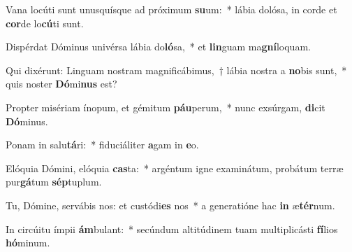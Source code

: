 \item Vana locúti sunt unusquísque ad próximum \textbf{su}um:~* lábia dolósa, in corde et \textbf{cor}de lo\textbf{cú}ti sunt.
\item Dispérdat Dóminus univérsa lábia do\textbf{ló}sa,~* et \textbf{lin}guam ma\textbf{gní}loquam.
\item Qui dixérunt: Linguam nostram magnificábimus,~† lábia nostra a \textbf{no}bis sunt,~* quis noster \textbf{Dó}mi\textbf{nus} est?
\item Propter misériam ínopum, et gémitum \textbf{páu}perum,~* nunc exsúrgam, \textbf{di}cit \textbf{Dó}minus.
\item Ponam in salu\textbf{tá}ri:~* fiduciáliter \textbf{a}gam in \textbf{e}o.
\item Elóquia Dómini, elóquia \textbf{cas}ta:~* argéntum igne examinátum, probátum terræ pur\textbf{gá}tum \textbf{sép}tuplum.
\item Tu, Dómine, servábis nos: et custódi\textbf{es} nos~* a generatióne hac \textbf{in} æ\textbf{tér}num.
\item In circúitu ímpii \textbf{ám}bulant:~* secúndum altitúdinem tuam multiplicásti \textbf{fí}lios \textbf{hó}minum.

